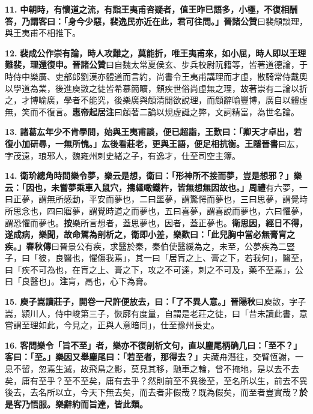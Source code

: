 \textbf{11.} \textbf{中朝時，有懷道之流，有詣王夷甫咨疑者，值王昨已語多，小極，不復相酬答，乃謂客曰：「身今少惡，裴逸民亦近在此，君可往問。」}{\footnotesize \textbf{晉諸公贊}曰裴頠談理，與王夷甫不相推下。}

\textbf{12.} \textbf{裴成公作崇有論，時人攻難之，莫能折，唯王夷甫來，如小屈，時人即以王理難裴，理還復申。}{\footnotesize \textbf{晉諸公贊}曰自魏太常夏侯玄、步兵校尉阮籍等，皆著道德論，于時侍中樂廣、吏部郎劉漢亦體道而言約，尚書令王夷甫講理而才虛，散騎常侍戴奧以學道為業，後進庾敳之徒皆希慕簡曠，頠疾世俗尚虛無之理，故著崇有二論以折之，才博喻廣，學者不能究，後樂廣與頠清閒欲說理，而頠辭喻豐博，廣自以體虛無，笑而不復言。\textbf{惠帝起居注}曰頠著二論以規虛誕之弊，文詞精富，為世名論。}

\textbf{13.} \textbf{諸葛厷年少不肯學問，始與王夷甫談，便已超詣，王歎曰：「卿天才卓出，若復小加研尋，一無所愧。」厷後看莊老，更與王語，便足相抗衡。}{\footnotesize \textbf{王隱晉書}曰厷，字茂遠，琅邪人，魏雍州刺史緒之子，有逸才，仕至司空主簿。}

\textbf{14.} \textbf{衛玠總角時問樂令夢，樂云是想，衛曰：「形神所不接而夢，豈是想邪？」樂云：「因也，未嘗夢乘車入鼠穴，擣䪢噉鐵杵，皆無想無因故也。」}{\footnotesize \textbf{周禮}有六夢，一曰正夢，謂無所感動，平安而夢也，二曰噩夢，謂驚愕而夢也，三曰思夢，謂覺時所思念也，四曰寤夢，謂覺時道之而夢也，五曰喜夢，謂喜說而夢也，六曰懼夢，謂恐懼而夢也。\textbf{按}樂所言想者，蓋思夢也，因者，蓋正夢也。}\textbf{衛思因，經日不得，遂成病，樂聞，故命駕為剖析之，衛即小差，樂歎曰：「此兒胸中當必無膏肓之疾。」}{\footnotesize \textbf{春秋傳}曰晉景公有疾，求醫於秦，秦伯使醫緩為之，未至，公夢疾為二豎子，曰「彼，良醫也，懼傷我焉」，其一曰「居肓之上、膏之下，若我何」，醫至，曰「疾不可為也，在肓之上、膏之下，攻之不可達，刺之不可及，藥不至焉」，公曰「良醫也」。\textbf{注}肓，鬲也，心下為膏。}

\textbf{15.} \textbf{庾子嵩讀莊子，開卷一尺許便放去，曰：「了不異人意。」}{\footnotesize \textbf{晉陽秋}曰庾敳，字子嵩，潁川人，侍中峻第三子，恢廓有度量，自謂是老莊之徒，曰「昔未讀此書，意嘗謂至理如此，今見之，正與人意暗同」，仕至豫州長史。}

\textbf{16.} \textbf{客問樂令「旨不至」者，樂亦不復剖析文句，直以麈尾柄确几曰：「至不？」客曰：「至。」樂因又舉麈尾曰：「若至者，那得去？」}{\footnotesize 夫藏舟潛往，交臂恆謝，一息不留，忽焉生滅，故飛鳥之影，莫見其移，馳車之輪，曾不掩地，是以去不去矣，庸有至乎？至不至矣，庸有去乎？然則前至不異後至，至名所以生，前去不異後去，去名所以立，今天下無去矣，而去者非假哉？既為假矣，而至者豈實哉？}\textbf{於是客乃悟服。樂辭約而旨達，皆此類。}

